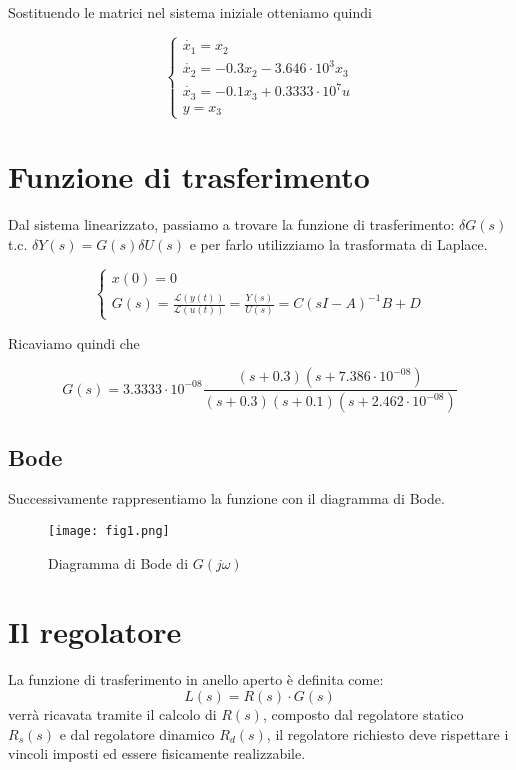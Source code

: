 \documentclass{article}
\begin{document}
Sostituendo le matrici nel sistema iniziale otteniamo quindi
\begin{large}
\[
\begin{cases}
\dot{x_1}=x_2\\
\dot{x_2}=-0.3x_2-3.646\cdot10^3 x_3\\
\dot{x_3}=-0.1 x_3+0.3333\cdot10^7 u\\
y=x_3
\end{cases}
\]
\end{large}

\section{Funzione di trasferimento}
Dal sistema linearizzato, passiamo a trovare la funzione di trasferimento: $\delta G(s)$ t.c. $\delta{Y} (s) = G(s)\delta{U} (s)$ e per farlo utilizziamo la trasformata di Laplace.

\begin{large}
\[
\begin{cases}
x(0)=0 \\
G(s)=\frac{\mathcal{L}(y(t))}{\mathcal{L}(u(t))}=\frac{Y(s)}{U(s)}=C(sI-A)^{-1} B +D
\end{cases}
\]
\end{large}

Ricaviamo quindi che
\begin{large}
\[
G(s) = 3.3333\cdot 10^{-08}\frac{(s+0.3) (s+7.386\cdot 10^{-08})} {(s+0.3) (s+0.1) (s+2.462\cdot 10^{-08})}
\]
\end{large}



\subsection{Bode}

Successivamente rappresentiamo la funzione con il diagramma di Bode.

\begin{figure}[!h]
\centering
\texttt{[image: fig1.png]}
\caption{\label{fig:bode}Diagramma di Bode di $G(j\omega)$}
\end{figure}

\section{Il regolatore}
La funzione di trasferimento in anello aperto è definita come:
\[ L(s) = R(s) \cdot G(s)  \]
verrà ricavata tramite il calcolo di $R(s)$, composto dal regolatore statico $R_s(s)$ e dal regolatore dinamico $R_d(s)$, il regolatore richiesto deve rispettare i vincoli imposti ed essere fisicamente realizzabile.
\end{document}
